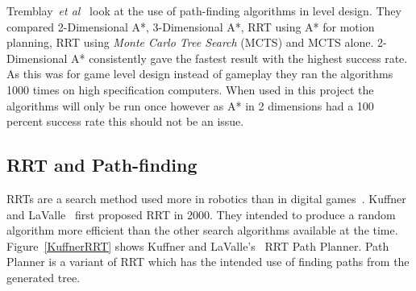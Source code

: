 \documentclass[journal]{IEEEtran}
\begin{document}
	Tremblay~\textit{et al}~\cite{Tremblay2014} look at the use of path-finding algorithms in level design. They compared 2-Dimensional A*, 3-Dimensional A*, RRT using A* for motion planning, RRT using \textit{Monte Carlo Tree Search} (MCTS) and MCTS alone. 2-Dimensional A* consistently gave the fastest result with the highest success rate. As this was for game level design instead of gameplay they ran the algorithms 1000 times on high specification computers. When used in this project the algorithms will only be run once however as A* in 2 dimensions had a 100 percent success rate this should not be an issue. 
	
	\subsection{RRT and Path-finding} \label{RRTadnPathfinding}
	RRTs are a search method used more in robotics than in digital games~\cite{LaValle1998, Kuffner2000}. Kuffner and LaValle~\cite{Kuffner2000} first proposed RRT in 2000. They intended to produce a random algorithm more efficient than the other search algorithms available at the time.  Figure~\ref{KuffnerRRT} shows Kuffner and LaValle's~\cite{Kuffner2000} RRT Path Planner. Path Planner is a variant of RRT which has the intended use of finding paths from the generated tree.
	
\end{document}
